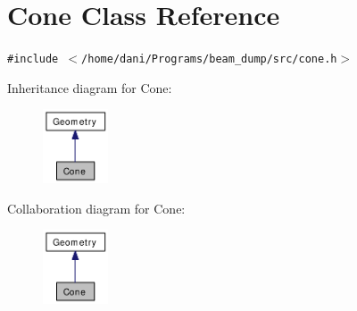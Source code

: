 \hypertarget{classCone}{
\section{Cone Class Reference}
\label{classCone}
}
{\tt \#include $<$/home/dani/Programs/beam\_\-dump/src/cone.h$>$}

Inheritance diagram for Cone:\nopagebreak
\begin{figure}[H]
\begin{center}
\leavevmode
\includegraphics[width=55pt]{classCone__inherit__graph}
\end{center}
\end{figure}
Collaboration diagram for Cone:\nopagebreak
\begin{figure}[H]
\begin{center}
\leavevmode
\includegraphics[width=55pt]{classCone__coll__graph}
\end{center}
\end{figure}
